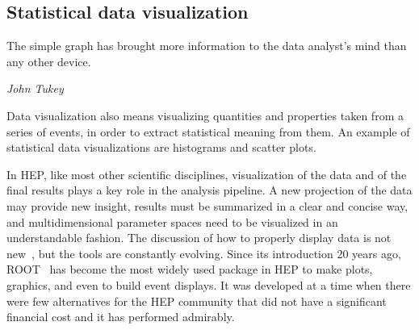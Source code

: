 \documentclass[12pt,a4paper]{article}
\begin{document}


\hypertarget{statistical-data-visualization}{%
\subsection{Statistical data visualization}\label{statistical-data-visualization}}


\epigraph{The simple graph has brought more information to the data analyst's mind than any other device.}{\textit{John Tukey \cite{Tukey1962}}}

Data visualization also means visualizing quantities and properties taken from a series of events, in order to extract statistical
meaning from them. An example of statistical data visualizations are histograms and scatter plots.

In HEP, like most other scientific disciplines, visualization of the data and of the final results plays a key role in the
analysis pipeline. A new projection of the data may provide new insight, results must be summarized in a
clear and concise way, and multidimensional parameter spaces need to be visualized in an understandable fashion. The discussion
of how to properly display data is not new~\cite{Tufte1986}, but the tools are constantly evolving. Since its introduction 20 years ago,
ROOT~\cite{Root1997} has become the most widely used package in HEP to make plots, graphics, and even to build event displays.
It was developed at a time when there were few alternatives for the HEP community that did not have a significant
financial cost and it has performed admirably.
\end{document}
